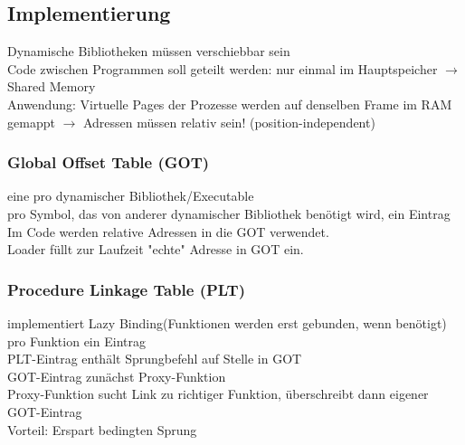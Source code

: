 \subsection{Implementierung}
Dynamische Bibliotheken müssen verschiebbar sein\\
Code zwischen Programmen soll geteilt werden: nur einmal im Hauptspeicher $\rightarrow$ Shared Memory\\
Anwendung: Virtuelle Pages der Prozesse werden auf denselben Frame im RAM gemappt $\rightarrow$ Adressen müssen relativ sein! (position-independent)



\subsubsection{Global Offset Table (GOT)}
eine pro dynamischer Bibliothek/Executable\\
pro Symbol, das von anderer dynamischer Bibliothek benötigt wird, ein Eintrag\\
Im Code werden relative Adressen in die GOT verwendet.\\
Loader füllt zur Laufzeit "echte" Adresse in GOT ein.

\subsubsection{Procedure Linkage Table (PLT)}
implementiert Lazy Binding(Funktionen werden erst gebunden, wenn benötigt)\\
pro Funktion ein Eintrag\\
PLT-Eintrag enthält Sprungbefehl auf Stelle in GOT\\
GOT-Eintrag zunächst Proxy-Funktion\\
Proxy-Funktion sucht Link zu richtiger Funktion, überschreibt dann eigener GOT-Eintrag\\
Vorteil: Erspart bedingten Sprung
